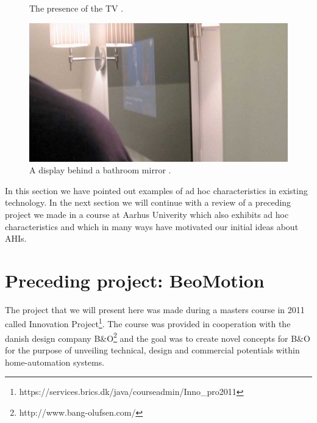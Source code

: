 \begin{figure}[h]
\begin{minipage}[b]{.44\textwidth}
		\caption{The presence of the TV \citep{lynggaard2012had}.}
		\label{fig:ch:adhoc:dubai-tv}
	\end{minipage}
\end{figure}

\begin{figure}[h]
	\centering
  		\includegraphics[width=.9\textwidth]{figures/adhoc/dubai-mirror}
	\caption{A display behind a bathroom mirror \citep{lynggaard2012had}.}
   \label{fig:ch:adhoc:dubai-mirror}
\end{figure}

\blank
In this section we have pointed out examples of ad hoc characteristics in existing technology.
In the next section we will continue with a review of a preceding project we made in a course at Aarhus Univerity which also exhibits ad hoc characteristics and which in many ways have motivated our initial ideas about AHIs.

\section{Preceding project: BeoMotion}

The project that we will present here was made during a masters course in 2011 called Innovation Project\footnote{https://services.brics.dk/java/courseadmin/Inno\_pro2011}.
The course was provided in cooperation with the danish design company B\&O\footnote{http://www.bang-olufsen.com/} and the goal was to create novel concepts for B\&O for the purpose of unveiling technical, design and commercial potentials within home-automation systems.

